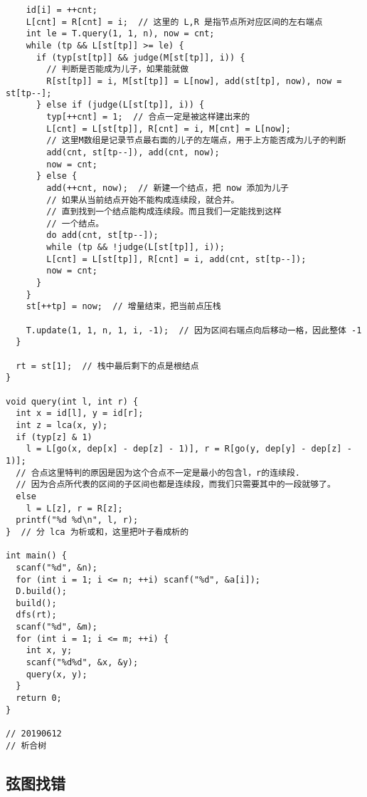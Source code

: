 \documentclass{ctexart}
\begin{document}
\begin{lstlisting}
    id[i] = ++cnt;
    L[cnt] = R[cnt] = i;  // 这里的 L,R 是指节点所对应区间的左右端点
    int le = T.query(1, 1, n), now = cnt;
    while (tp && L[st[tp]] >= le) {
      if (typ[st[tp]] && judge(M[st[tp]], i)) {
        // 判断是否能成为儿子，如果能就做
        R[st[tp]] = i, M[st[tp]] = L[now], add(st[tp], now), now = st[tp--];
      } else if (judge(L[st[tp]], i)) {
        typ[++cnt] = 1;  // 合点一定是被这样建出来的
        L[cnt] = L[st[tp]], R[cnt] = i, M[cnt] = L[now];
        // 这里M数组是记录节点最右面的儿子的左端点，用于上方能否成为儿子的判断
        add(cnt, st[tp--]), add(cnt, now);
        now = cnt;
      } else {
        add(++cnt, now);  // 新建一个结点，把 now 添加为儿子
        // 如果从当前结点开始不能构成连续段，就合并。
        // 直到找到一个结点能构成连续段。而且我们一定能找到这样
        // 一个结点。
        do add(cnt, st[tp--]);
        while (tp && !judge(L[st[tp]], i));
        L[cnt] = L[st[tp]], R[cnt] = i, add(cnt, st[tp--]);
        now = cnt;
      }
    }
    st[++tp] = now;  // 增量结束，把当前点压栈

    T.update(1, 1, n, 1, i, -1);  // 因为区间右端点向后移动一格，因此整体 -1
  }

  rt = st[1];  // 栈中最后剩下的点是根结点
}

void query(int l, int r) {
  int x = id[l], y = id[r];
  int z = lca(x, y);
  if (typ[z] & 1)
    l = L[go(x, dep[x] - dep[z] - 1)], r = R[go(y, dep[y] - dep[z] - 1)];
  // 合点这里特判的原因是因为这个合点不一定是最小的包含l，r的连续段.
  // 因为合点所代表的区间的子区间也都是连续段，而我们只需要其中的一段就够了。
  else
    l = L[z], r = R[z];
  printf("%d %d\n", l, r);
}  // 分 lca 为析或和，这里把叶子看成析的

int main() {
  scanf("%d", &n);
  for (int i = 1; i <= n; ++i) scanf("%d", &a[i]);
  D.build();
  build();
  dfs(rt);
  scanf("%d", &m);
  for (int i = 1; i <= m; ++i) {
    int x, y;
    scanf("%d%d", &x, &y);
    query(x, y);
  }
  return 0;
}

// 20190612
// 析合树
\end{lstlisting}

\subsection{弦图找错}
\end{document}
